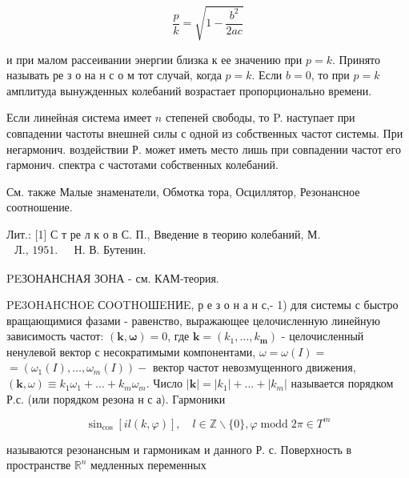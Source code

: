\documentclass[10pt]{article}
\begin{document}
\[

\frac{p}{k}=\sqrt{1-\frac{b^{2}}{2 a c}}

\]



и при малом рассеивании энергии близка к ее значению при $p=k$. Принято называть ре з о на н с о м тот случай, когда $p=k$. Если $b=0$, то при $p=k$ амплитуда вынужденных колебаний возрастает пропорционально времени.



Если линейная система имеет $n$ степеней свободы, то P. наступает при совпадении частоты внешней силы с одной из собственных частот системы. При негармонич. воздействии Р. может иметь место лишь при совпадении частот его гармонич. спектра с частотами собственных колебаний.



См. также Малые знаменатели, Обмотка тора, Осциллятор, Резонансное соотношение.



Лит.: [1] С т ре л к о в С. П., Введение в теорию колебаний, М.$\begin{array}{ll}\text { Л., 1951. } & \text { Н. В. Бутенин. }\end{array}$



PEЗОНАНСНАЯ ЗОНА - см. КАМ-теория.



PE3OHAHCHOE СOOTHOШEHИE, р е з о н а н с,- 1) для системы с быстро вращающимися фазами - равенство, выражающее целочисленную линейную зависимость частот: $(\boldsymbol{k}, \boldsymbol{\omega})=0$, где $\boldsymbol{k}=\left(k_{1}, \ldots, k_{\boldsymbol{m}}\right)$ - целочисленный ненулевой вектор с несократимыми компонентами, $\omega=\omega(I)=$ $=\left(\omega_{1}(I), \ldots, \omega_{m}(I)\right)-$ вектор частот невозмущенного движения, $(\boldsymbol{k}, \omega) \equiv k_{1} \omega_{1}+\ldots+k_{m} \omega_{m}$. Число $|\boldsymbol{k}|=\left|k_{1}\right|+\ldots+\left|k_{m}\right|$ называется порядком Р.с. (или порядком резона н с а). Гармоники



\[

\sin _{\cos }[i l(k, \varphi)], \quad l \in \mathbb{Z} \backslash\{0\}, \varphi \operatorname{modd} 2 \pi \in T^{m}

\]



называются резонансным и гармоникам и данного Р. с. Поверхность в пространстве $\mathbb{R}^{n}$ медленных переменных
\end{document}
